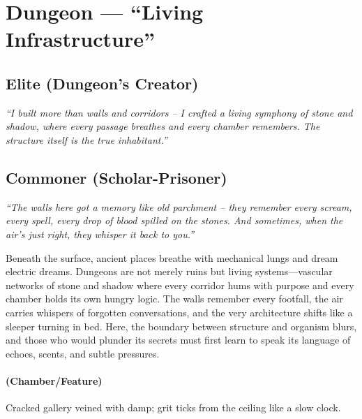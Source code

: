 \section{Dungeon --- ``Living Infrastructure''}
\label{chap:dungeon-generator}

\subsection*{Elite (Dungeon's Creator)}
\textit{``I built more than walls and corridors – I crafted a living symphony of stone and shadow, where every passage breathes and every chamber remembers. The structure itself is the true inhabitant.''}

\subsection*{Commoner (Scholar-Prisoner)}
\textit{``The walls here got a memory like old parchment – they remember every scream, every spell, every drop of blood spilled on the stones. And sometimes, when the air's just right, they whisper it back to you.''}

\begin{tcolorbox}[colback=black!3,colframe=black!40!white,title={Theme \& Atmosphere}]
Beneath the surface, ancient places breathe with mechanical lungs and dream electric dreams. Dungeons are not merely ruins but living systems—vascular networks of stone and shadow where every corridor hums with purpose and every chamber holds its own hungry logic. The walls remember every footfall, the air carries whispers of forgotten conversations, and the very architecture shifts like a sleeper turning in bed. Here, the boundary between structure and organism blurs, and those who would plunder its secrets must first learn to speak its language of echoes, scents, and subtle pressures.
\end{tcolorbox}

\paragraph*{(Chamber/Feature)} Cracked gallery veined with damp; grit ticks from the ceiling like a slow clock.

